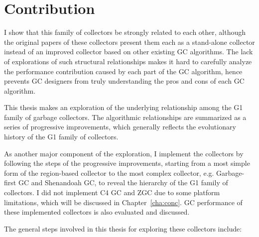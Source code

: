 

\section{Contribution}

I show that this family of collectors be strongly related to each other,
although the original papers of these collectors present them each as a stand-alone collector
instead of an improved collector based on other existing GC algorithms. The lack of
explorations of such structural relationships makes it hard to carefully analyze
the performance contribution caused by each part of the GC algorithm, hence prevents
GC designers from truly understanding the pros and cons of each GC algorithm.

This thesis makes an exploration of the underlying relationship among the
G1 family of garbage collectors. The algorithmic relationships are summarized
as a series of progressive improvements, which generally reflects the evolutionary
history of the G1 family of collectors.

As another major component of the exploration, I implement the collectors by following
the steps of the progressive improvements, starting from a most simple form of the
region-based collector to the most complex collector, e.g. Garbage-first GC and
Shenandoah GC, to reveal the hierarchy of the G1 family of collectors.
I did not implement C4 GC and ZGC due to some platform limitations, which will be
discussed in Chapter~\ref{cha:conc}.
GC performance of these implemented collectors is also evaluated and discussed.

The general steps involved in this thesis for exploring these collectors include:

